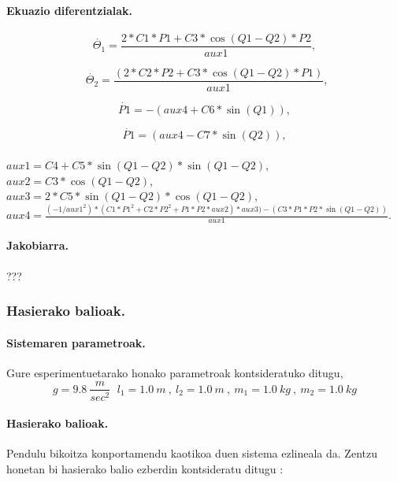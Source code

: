 \paragraph*{Ekuazio diferentzialak.}

\begin{equation*}
\dot{\Theta_1}= \frac {2*C1*P1+C3*\cos(Q1-Q2)*P2}{aux1},
\end{equation*}

\begin{equation*}
 \ \ \dot{\Theta_2}= \frac{(2*C2*P2+C3*\cos(Q1-Q2)*P1)}{aux1},
\end{equation*}

\begin{equation*}
\dot{P1}=-(aux4+C6*\sin(Q1)), 
\end{equation*}

\begin{equation*}
\dot{P1}=(aux4-C7*\sin(Q2)), 
\end{equation*}

\paragraph*{}
$aux1=C4+C5*\sin(Q1-Q2)*\sin(Q1-Q2)$, \\
$aux2=C3*\cos(Q1-Q2)$,\\
$aux3=2*C5*\sin(Q1-Q2)*\cos(Q1-Q2)$,\\
$aux4=\frac{(-1/aux1^2)*(C1*P1^2+C2*P2^2+P1*P2*aux2)*aux3)-(C3*P1*P2*\sin(Q1-Q2))}{aux1}.$ 

\paragraph*{Jakobiarra.}
???

\subsubsection{Hasierako balioak.}

\paragraph*{\textbf{Sistemaren parametroak}.} 
Gure esperimentuetarako honako parametroak kontsideratuko ditugu,
\begin{equation*} \label{eq:17}
g=9.8 \ \frac{m}{sec^2}\,\ \ l_1=1.0 \ m \ , \ l_2=1.0 \ m\ , \ m_1=1.0 \ kg\ , \ m_2=1.0 \ kg
\end{equation*} 

\paragraph*{\textbf{Hasierako balioak}.}
Pendulu bikoitza konportamendu kaotikoa duen sistema ezlineala da. Zentzu honetan bi hasierako balio ezberdin kontsideratu ditugu \cite{Dumitru}:

